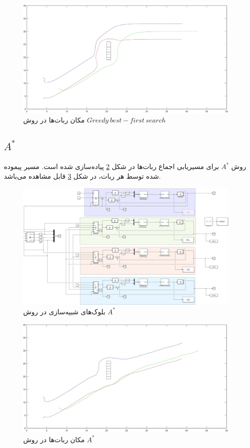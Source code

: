 \begin{figure}[!h]
	\centering
	\includegraphics[scale=0.2]{Images/platoon-Greedy-pos.jpg}
	\caption{مکان ربات‌ها در روش $Greedy~best-first~search$}\label{Fig platoon-Greedy-pos}
\end{figure}


\subsection{$A^*$}
روش $A^*$ برای مسیریابی اجماع ربات‌ها در شکل \ref{Fig platoon-A-star-simulink} پیاده‌سازی شده است. مسیر پیموده شده توسط هر ربات، در شکل \ref{Fig platoon-A-star-pos} قابل مشاهده می‌باشد.
\begin{figure}[!h]
	\centering
	\includegraphics[scale=0.22]{Images/platoon-A-star-simulink.png}
	\caption{بلوک‌های شبیه‌سازی در روش $A^*$}\label{Fig platoon-A-star-simulink}
\end{figure}

\begin{figure}[!h]
	\centering
	\includegraphics[scale=0.2]{Images/platoon-A-star-pos.jpg}
	\caption{مکان ربات‌ها در روش $A^*$}\label{Fig platoon-A-star-pos}
\end{figure}

